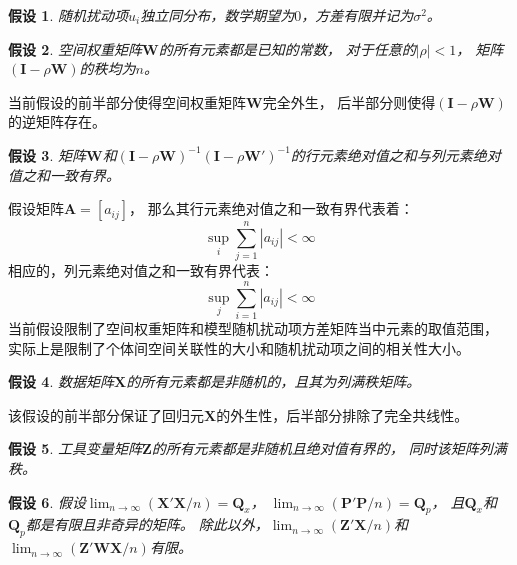 \documentclass[black,normal,authoryear]{elegantnote}
\newcommand{\bmw}{\bm{W}}
\newcommand{\bmi}{\bm{I}}
\newcommand{\bmx}{\bm{X}}
\newcommand{\bmz}{\bm{Z}}
\newcommand{\bmq}{\bm{Q}}
\newcommand{\bmp}{\bm{P}}
\newtheorem{assumption}{假设}[section]
\begin{document}
    \begin{assumption}
        随机扰动项$u_i$独立同分布，数学期望为$0$，方差有限并记为$\sigma^2$。
    \end{assumption}

    \begin{assumption}
        \label{ass:inverse_exist}
        空间权重矩阵$\bm{W}$的所有元素都是已知的常数，
        对于任意的$|\rho|<1$，
        矩阵$(\bm{I}-\rho\bm{W})$的秩均为$n$。
    \end{assumption}
    \begin{remark}
        当前假设的前半部分使得空间权重矩阵$\bm{W}$完全外生，
        后半部分则使得$(\bmi-\rho\bmw)$的逆矩阵存在。
    \end{remark}

    \begin{assumption}
        \label{ass:abs_sum_bounded}
        矩阵$\bmw$和$(\bmi-\rho\bmw)^{-1}(\bmi-\rho\bmw')^{-1}$的行元素绝对值之和与列元素绝对值之和一致有界。
    \end{assumption}
    \begin{remark}
        假设矩阵$\bm{A}=[a_{ij}]$，
        那么其行元素绝对值之和一致有界代表着：
        \begin{equation*}
            \sup_i\sum_{j=1}^n|a_{ij}|<\infty
        \end{equation*}
        相应的，列元素绝对值之和一致有界代表：
        \begin{equation*}
            \sup_j\sum_{i=1}^n|a_{ij}|<\infty
        \end{equation*}
        当前假设限制了空间权重矩阵和模型随机扰动项方差矩阵当中元素的取值范围，
        实际上是限制了个体间空间关联性的大小和随机扰动项之间的相关性大小。
    \end{remark}

    \begin{assumption}
        数据矩阵$\bm{X}$的所有元素都是非随机的，且其为列满秩矩阵。
    \end{assumption}
    \begin{remark}
        该假设的前半部分保证了回归元$\bmx$的外生性，后半部分排除了完全共线性。
    \end{remark}

    \begin{assumption}
        工具变量矩阵$\bmz$的所有元素都是非随机且绝对值有界的，
        同时该矩阵列满秩。
    \end{assumption}

    \begin{assumption}
        假设$\lim_{n\to\infty}(\bmx'\bmx/n)=\bmq_x$，
        $\lim_{n\to\infty}(\bmp'\bmp/n)=\bmq_p$，
        且$\bmq_x$和$\bmq_p$都是有限且非奇异的矩阵。
        除此以外，$\lim_{n\to\infty}(\bmz'\bmx/n)$和$\lim_{n\to\infty}(\bmz'\bmw\bmx/n)$有限。
    \end{assumption}
\end{document}
